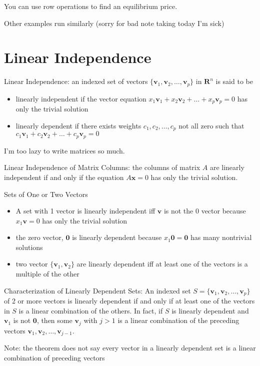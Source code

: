 \documentclass[../linalg.tex]{subfiles}
\begin{document}
You can use row operations to find an equilibrium price.

Other examples run similarly (sorry for bad note taking today I'm sick)

\section{Linear Independence}
Linear Independence: an indexed set of vectors $\{\textbf{v}_1,\textbf{v}_2,\dots,\textbf{v}_p\}$ in $\textbf{R}^n$ is said to be 
\begin{itemize}
    \item linearly independent if the vector equation $x_1\textbf{v}_1+x_2\textbf{v}_2+\dots+x_p\textbf{v}_p=0$ has only the trivial solution 
    \item linearly dependent if there exists weights $c_1,c_2,\dots,c_p$ not all zero such that $c_1\textbf{v}_1+c_2\textbf{v}_2+\dots+c_p\textbf{v}_p=0$
\end{itemize}

I'm too lazy to write matrices so much.

Linear Independence of Matrix Columns: the columns of matrix $A$ are linearly independent if and only if the equation $A\textbf{x}=0$ has only the trivial solution.

Sets of One or Two Vectors 
\begin{itemize}
    \item A set with 1 vector is linearly independent iff $\textbf{v}$ is not the 0 vector because $x_1\textbf{v}=0$ has only the trivial solution 
    \item the zero vector, $\textbf{0}$ is linearly dependent because $x_1\textbf{0}=\textbf{0}$ has many nontrivial solutions 
    \item two vector $\{\textbf{v}_1,\textbf{v}_2\}$ are linearly dependent iff at least one of the vectors is a multiple of the other 
\end{itemize}

\begin{theorem}
    Characterization of Linearly Dependent Sets: An indexed set $S=\{\textbf{v}_1,\textbf{v}_2,\dots,\textbf{v}_p\}$ of 2 or more vectors is linearly dependent if and only if at least 
    one of the vectors in $S$ is a linear combination of the others. In fact, if $S$ is linearly dependent and $\textbf{v}_1$ is not $\textbf{0}$, then some $\textbf{v}_j$ with $j>1$ is a linear combination 
    of the preceding vectors $\textbf{v}_1,\textbf{v}_2,\dots,\textbf{v}_{j-1}$.

    Note: the theorem does not say every vector in a linearly dependent set is a linear combination of preceding vectors 
\end{theorem}
\end{document}
